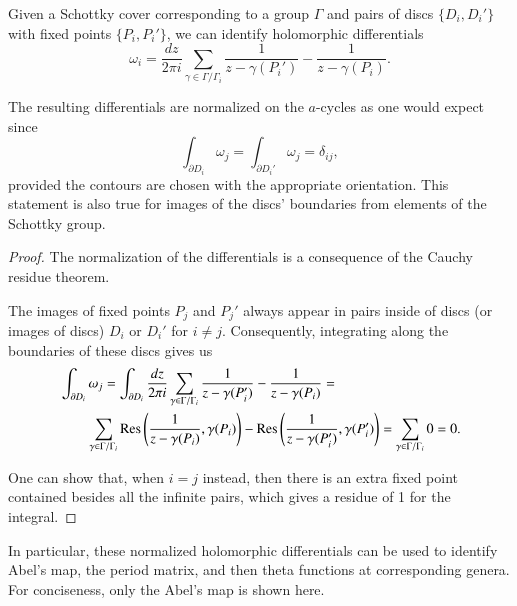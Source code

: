 \begin{definition}
    Given a Schottky cover corresponding to a group $\Gamma$ and pairs of discs $\{D_i,D_i'\}$ with fixed points $\{P_i,P_i'\}$, we can identify holomorphic differentials
    \begin{equation}
        \omega_i = \frac{dz}{2\pi i} \sum_{\gamma \in \Gamma / \Gamma_i} \frac{1}{z - \gamma(P_i')} - \frac{1}{z - \gamma(P_i)}.
    \end{equation}

    The resulting differentials are normalized on the $a$-cycles as one would expect since
    \begin{equation}
        \int_{\partial D_i} \omega_j = \int_{\partial D_i'} \omega_j = \delta_{ij},
    \end{equation}
    provided the contours are chosen with the appropriate orientation. This statement is also true for images of the discs' boundaries from elements of the Schottky group.
\end{definition}
\begin{proof}
    The normalization of the differentials is a consequence of the Cauchy residue theorem.

    The images of fixed points $P_j$ and $P_j'$ always appear in pairs inside of discs (or images of discs) $D_i$ or $D_i'$ for $i \neq j$.
    Consequently, integrating along the boundaries of these discs gives us
    \begin{align}
        & \int_{\partial D_i} \omega_j =
        \int_{\partial D_i} \frac{dz}{2\pi i} \sum_{\gamma \in \Gamma / \Gamma_i} \frac{1}{z - \gamma(P_i')} - \frac{1}{z - \gamma(P_i)} = \\
        & \quad \quad \sum_{\gamma \in \Gamma / \Gamma_i} \operatorname{Res}\left(\frac{1}{z - \gamma(P_i)},\gamma(P_i)\right) - \operatorname{Res}\left(\frac{1}{z - \gamma(P_i')},\gamma(P_i')\right) =
        \sum_{\gamma \in \Gamma / \Gamma_i} 0 = 0.
    \end{align}

    One can show that, when $i = j$ instead, then there is an extra fixed point contained besides all the infinite pairs, which gives a residue of 1 for the integral.
\end{proof}

In particular, these normalized holomorphic differentials can be used to identify Abel's map, the period matrix, and then theta functions at corresponding genera.
For conciseness, only the Abel's map is shown here.

